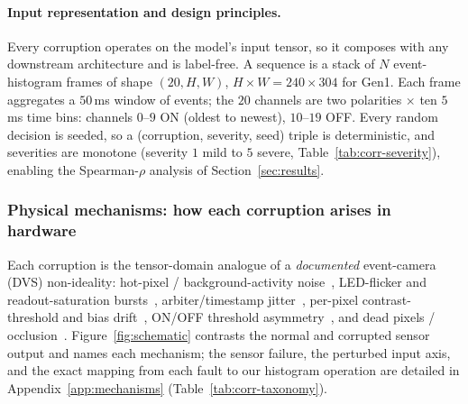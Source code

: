 ﻿\documentclass{article} %
\theoremstyle{remark}
\begin{document}
\paragraph{Input representation and design principles.}
Every corruption operates on the model's input tensor, so it composes with any downstream
architecture and is label-free. A sequence is a stack of $N$ event-histogram frames of shape
$(20,H,W)$, $H\times W=240\times304$ for Gen1. Each frame aggregates a $50$\,ms window of events;
the $20$ channels are two polarities $\times$ ten $5$\,ms time bins: channels $0$--$9$ ON (oldest to
newest), $10$--$19$ OFF. Every random decision is seeded, so a (corruption, severity, seed) triple
is deterministic, and
severities are monotone (severity $1$ mild to $5$ severe, Table~\ref{tab:corr-severity}), enabling the
Spearman-$\rho$ analysis of Section~\ref{sec:results}.

\subsubsection{Physical mechanisms: how each corruption arises in hardware}
\label{sec:mechanisms}

Each corruption is the tensor-domain analogue of a
\emph{documented} event-camera (DVS) non-ideality: hot-pixel / background-activity
noise~\citep{hu2021v2e,guo2023badenoising}, LED-flicker and readout-saturation
bursts~\citep{wang2022combfilter,gehrig2024lowlatency}, arbiter/timestamp
jitter~\citep{gehrig2024lowlatency,gallego2022survey}, per-pixel contrast-threshold and bias
drift~\citep{wang2019threshold,graca2023dvspixel}, ON/OFF threshold
asymmetry~\citep{wang2019threshold,hu2021v2e}, and dead pixels / occlusion~\citep{gallego2022survey}.
Figure~\ref{fig:schematic} contrasts the normal and corrupted sensor output and names each
mechanism; the sensor failure, the perturbed input axis, and the exact mapping from each fault to
our histogram operation are detailed in Appendix~\ref{app:mechanisms}
(Table~\ref{tab:corr-taxonomy}).
\end{document}
